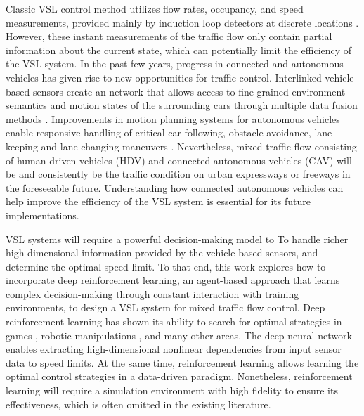 \documentclass[11pt, letterpaper]{article}
\begin{document}
Classic VSL control method utilizes flow rates, occupancy, and speed measurements, provided mainly by induction loop detectors at discrete locations \citep{HCM2000}. However, these instant measurements of the traffic flow only contain partial information about the current state, which can potentially limit the efficiency of the VSL system. In the past few years, progress in connected and autonomous vehicles has given rise to new opportunities for traffic control. Interlinked vehicle-based sensors create an network that allows access to fine-grained environment semantics and motion states of the surrounding cars through multiple data fusion methods \citep{liggins1997distributed, lee2008unscented, taj2011distributed}. Improvements in motion planning systems for autonomous vehicles enable responsive handling of critical car-following, obstacle avoidance, lane-keeping and lane-changing maneuvers \citep{claussmann2019review}. Nevertheless, mixed traffic flow consisting of human-driven vehicles (HDV) and connected autonomous vehicles (CAV) will be and consistently be the traffic condition on urban expressways or freeways in the foreseeable future. Understanding how connected autonomous vehicles can help improve the efficiency of the VSL system is essential for its future implementations.

VSL systems will require a powerful decision-making model to To handle richer high-dimensional information provided by the vehicle-based sensors, and determine the optimal speed limit. To that end, this work explores how to incorporate deep reinforcement learning, an agent-based approach that learns complex decision-making through constant interaction with training environments, to design a VSL system for mixed traffic flow control. Deep reinforcement learning has shown its ability to search for optimal strategies in games \citep{silver2016mastering, https://doi.org/10.48550/arxiv.1712.01815, https://doi.org/10.48550/arxiv.2011.12692}, robotic manipulations \citep{8675643}, and many other areas. The deep neural network enables extracting high-dimensional nonlinear dependencies from input sensor data to speed limits. At the same time, reinforcement learning allows learning the optimal control strategies in a data-driven paradigm. Nonetheless, reinforcement learning will require a simulation environment with high fidelity to ensure its effectiveness, which is often omitted in the existing literature.
\end{document}
